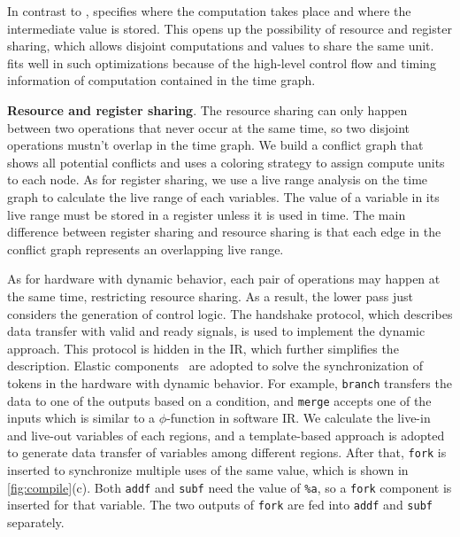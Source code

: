 In contrast to \tor, \hec specifies where the computation takes place and where the intermediate value is stored. This opens up the possibility of resource and register sharing, which allows disjoint computations and values to share the same unit. \tor fits well in such optimizations because of the high-level control flow and timing information of computation contained in the time graph.

\textbf{Resource and register sharing}. The resource sharing can only happen between two operations that never occur at the same time, so two disjoint operations mustn't overlap in the time graph. We build a conflict graph that shows all potential conflicts and uses a coloring strategy to assign compute units to each node. As for register sharing, we use a live range analysis on the time graph to calculate the live range of each variables. The value of a variable in its live range must be stored in a register unless it is used in time. The main difference between register sharing and resource sharing is that each edge in the conflict graph represents an overlapping live range. 

As for hardware with dynamic behavior, each pair of operations may happen at the same time, restricting resource sharing. As a result, the lower pass just considers the generation of control logic. The handshake protocol, which describes data transfer with valid and ready signals, is used to implement the dynamic approach. This protocol is hidden in the \hec IR, which further simplifies the description. 
Elastic components~\cite{elastic_circuit} are adopted to solve the synchronization of tokens in the hardware with dynamic behavior. For example, \verb|branch| transfers the data to one of the outputs based on a condition, and \verb|merge| accepts one of the inputs which is similar to a $\phi$-function in software IR. We calculate the live-in and live-out variables of each regions, and a template-based approach is adopted to generate data transfer of variables among different regions. After that, \verb|fork| is inserted to synchronize multiple uses of the same value, which is shown in \autoref{fig:compile}(c). Both \verb|addf| and \verb|subf| need the value of \verb|%a|, so a \verb|fork| component is inserted for that variable. The two outputs of \verb|fork| are fed into \verb|addf| and \verb|subf| separately.

